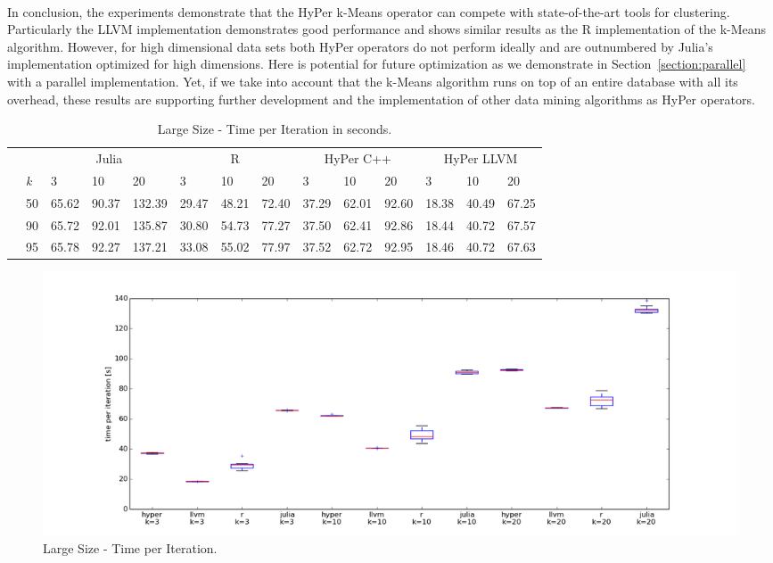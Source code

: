 \\
In conclusion, the experiments demonstrate that the HyPer k-Means operator can compete with state-of-the-art tools for clustering. Particularly the LLVM implementation demonstrates good performance and shows similar results as the R implementation of the k-Means algorithm. However, for high dimensional data sets both HyPer operators do not perform ideally and are outnumbered by Julia's implementation optimized for high dimensions. Here is potential for future optimization as we demonstrate in Section~\ref{section:parallel} with a parallel implementation. Yet, if we take into account that the k-Means algorithm runs on top of an entire database with all its overhead, these results are supporting further development and the implementation of other data mining algorithms as HyPer operators. 




\begin{table}[htsb]
  \caption[Large Size - Time per Iteration]{Large Size - Time per Iteration in seconds.}
  \label{tab:150M_all}
  \centering
  \begin{tabular}{l l l ll |l l l |l l l |l l l}
    \toprule
      && \multicolumn{3}{c}{Julia} & \multicolumn{3}{c}{R} & \multicolumn{3}{c}{HyPer C++} & \multicolumn{3}{c}{HyPer LLVM}  \\
      &\emph{k} & 3 & 10 & 20 & 3 & 10 & 20 & 3 & 10 & 20 & 3 & 10 & 20 \\
    \midrule
      \parbox[t]{2mm}{} &50  & 65.62 & 90.37 & 132.39 & 29.47 & 48.21 & 72.40 & 37.29 & 62.01 & 92.60 & 18.38 & 40.49 & 67.25 \\
      &90  & 65.72 & 92.01 & 135.87 & 30.80 & 54.73 & 77.27 & 37.50 & 62.41 & 92.86 & 18.44 & 40.72 & 67.57 \\
      &95  & 65.78 & 92.27 & 137.21 & 33.08 & 55.02 & 77.97 & 37.52 & 62.72 & 92.95 & 18.46 & 40.72 & 67.63 \\
    \bottomrule
  \end{tabular}
\end{table}





\begin{figure}[htsb]
  \centerline{
    \includegraphics[scale=0.4, trim="0cm 1cm 0cm 0cm"]{figures/charts/150M_all}
  }
  \caption[Large Size - Time per Iteration]{Large Size - Time per Iteration.}
  \label{fig:150M_all}
\end{figure}



